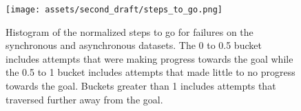 \begin{figure}[t!]
    \centering
    \texttt{[image: assets/second\_draft/steps\_to\_go.png]}
    \caption{Histogram of the normalized steps to go for \gptfo{} \react{} failures on the synchronous and asynchronous datasets. The 0 to 0.5 bucket includes attempts that were making progress towards the goal while the 0.5 to 1 bucket includes attempts that made little to no progress towards the goal. Buckets greater than 1 includes attempts that traversed further away from the goal.
    }
    \label{fig:histogram_steps_to_go}
\end{figure}